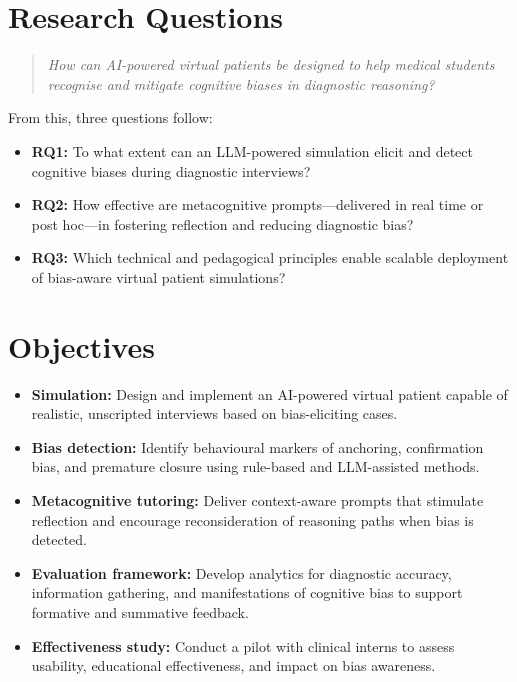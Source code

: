 \section{Research Questions}
\label{sec:rq}

\begin{quote}
\textit{How can AI-powered virtual patients be designed to help medical students recognise and mitigate cognitive biases in diagnostic reasoning?}
\end{quote}

From this, three questions follow:

\begin{itemize}
  \item \textbf{RQ1:} To what extent can an LLM-powered simulation elicit and detect cognitive biases during diagnostic interviews?
  \item \textbf{RQ2:} How effective are metacognitive prompts—delivered in real time or post hoc—in fostering reflection and reducing diagnostic bias?
  \item \textbf{RQ3:} Which technical and pedagogical principles enable scalable deployment of bias-aware virtual patient simulations?
\end{itemize}

\section{Objectives}
\label{sec:ae2}

\begin{itemize}
  \item \textbf{Simulation:} Design and implement an AI-powered virtual patient capable of realistic, unscripted interviews based on bias-eliciting cases.
  \item \textbf{Bias detection:} Identify behavioural markers of anchoring, confirmation bias, and premature closure using rule-based and LLM-assisted methods.
  \item \textbf{Metacognitive tutoring:} Deliver context-aware prompts that stimulate reflection and encourage reconsideration of reasoning paths when bias is detected.
  \item \textbf{Evaluation framework:} Develop analytics for diagnostic accuracy, information gathering, and manifestations of cognitive bias to support formative and summative feedback.
  \item \textbf{Effectiveness study:} Conduct a pilot with clinical interns to assess usability, educational effectiveness, and impact on bias awareness.
\end{itemize}

